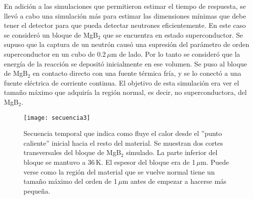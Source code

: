 En adición a las simulaciones que permitieron estimar el tiempo de respuesta, se llevó a cabo una simulación más para estimar las dimensiones mínimas que debe tener el detector para que pueda detectar neutrones eficientemente. En este caso se consideró un bloque de MgB$_2$ que se encuentra en estado superconductor. Se supuso que la captura de un neutrón causó una supresión del parámetro de orden superconductor en un cubo de 0.2\,$\mu$m de lado\cite{Machida2004}. Por lo tanto se consideró que la energía de la reacción se depositó inicialmente en ese volumen. Se puso al bloque de MgB$_2$ en contacto directo con una fuente térmica fría, y se lo conectó a una fuente eléctrica de corriente continua. El objetivo de esta simulación era ver el tamaño máximo que adquiría la región normal, es decir, no superconductora, del MgB$_2$.
\begin{figure}[h!]
 \begin{center}
    \texttt{[image: secuencia3]}
  \end{center}
  \caption[Secuencia temporal que indica como fluye el calor desde el ''punto caliente'' inicial hacia el resto del material.]{Secuencia temporal que indica como fluye el calor desde el ''punto caliente'' inicial hacia el resto del material. Se muestran dos cortes transversales del bloque de MgB$_2$ simulado. La parte inferior del bloque se mantuvo a 36\,K. El espesor del bloque era de 1\,$\mu$m. Puede verse como la región del material que se vuelve normal tiene un tamaño máximo del orden de 1\,$\mu$m antes de empezar a hacerse más pequeña.}
\label{fig:secuencia}
\end{figure}

